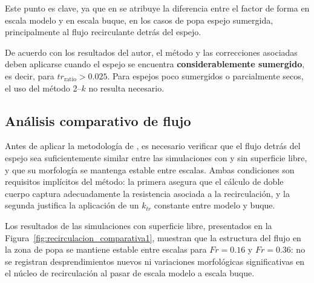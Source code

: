 Este punto es clave, ya que en \citet{korkmaz_wetted_transom} se atribuye la diferencia entre el factor de forma en escala modelo y en escala buque, en los casos de popa espejo sumergida, principalmente al flujo recirculante detrás del espejo.

De acuerdo con los resultados del autor, el método y las correcciones asociadas deben aplicarse cuando el espejo se encuentra \textbf{considerablemente sumergido}, es decir, para 
$tr_{\text{ratio}} > 0{.}025$. Para espejos poco sumergidos o parcialmente secos, el uso del método 2--$k$ no resulta necesario.

\subsection{Análisis comparativo de flujo}

Antes de aplicar la metodología de \citet{korkmaz_wetted_transom}, es 
necesario verificar que el flujo detrás del espejo sea suficientemente 
similar entre las simulaciones con y sin superficie libre, y que su 
morfología se mantenga estable entre escalas. Ambas condiciones son 
requisitos implícitos del método: la primera asegura que el cálculo de doble 
cuerpo captura adecuadamente la resistencia asociada a la recirculación, y la 
segunda justifica la aplicación de un $k_{tr}$ constante entre modelo y 
buque.

Los resultados de las simulaciones con superficie libre, presentados en la 
Figura~\ref{fig:recirculacion_comparativa1}, muestran que la estructura del 
flujo en la zona de popa se mantiene estable entre escalas para $Fr = 0{.}16$ 
y $Fr = 0{.}36$: no se registran desprendimientos nuevos ni variaciones 
morfológicas significativas en el núcleo de recirculación al pasar de escala 
modelo a escala buque.


